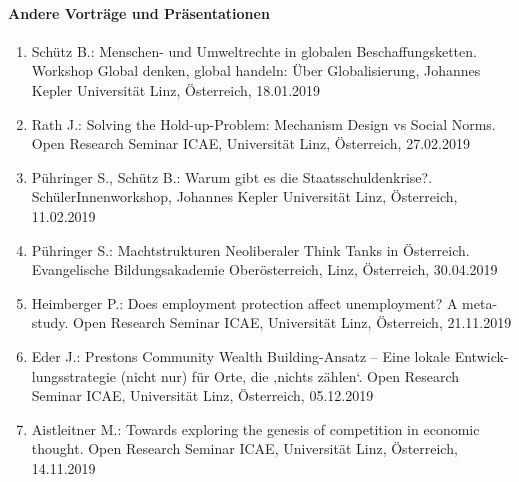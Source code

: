     \paragraph{Andere Vorträge und Präsentationen}
\begin{enumerate}
	\item Schütz B.: Menschen- und Umweltrechte in globalen Beschaffungsketten. Workshop Global denken, global handeln: Über Globalisierung, Johannes Kepler Universität Linz, Österreich, 18.01.2019
	\item Rath J.: Solving the Hold-up-Problem: Mechanism Design vs Social Norms. Open Research Seminar ICAE, Universität Linz, Österreich, 27.02.2019
	\item Pühringer S., Schütz B.: Warum gibt es die Staatsschuldenkrise?. SchülerInnenworkshop, Johannes Kepler Universität Linz, Österreich, 11.02.2019
	\item Pühringer S.: Machtstrukturen Neoliberaler Think Tanks in Österreich. Evangelische Bildungsakademie Oberösterreich, Linz, Österreich, 30.04.2019
	\item Heimberger P.: Does employment protection affect unemployment? A meta-study. Open Research Seminar ICAE, Universität Linz, Österreich, 21.11.2019
	\item Eder J.: Prestons Community Wealth Building-Ansatz – Eine lokale Entwick-lungsstrategie (nicht nur) für Orte, die ‚nichts zählen‘. Open Research Seminar ICAE, Universität Linz, Österreich, 05.12.2019
	\item Aistleitner M.: Towards exploring the genesis of competition in economic thought. Open Research Seminar ICAE, Universität Linz, Österreich, 14.11.2019
\end{enumerate}
